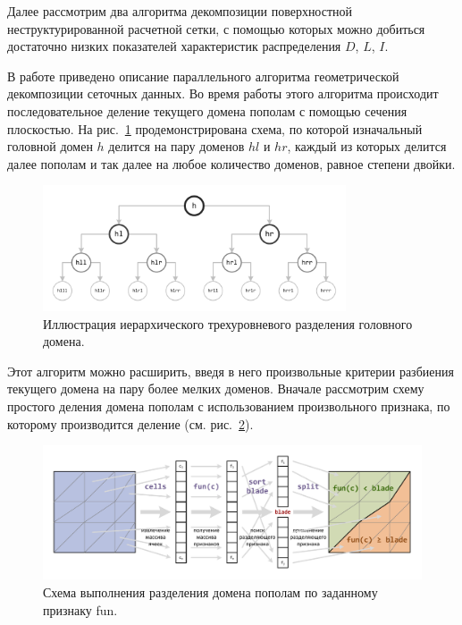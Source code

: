 Далее рассмотрим два алгоритма декомпозиции поверхностной неструктурированной расчетной сетки, с помощью которых можно добиться достаточно низких показателей характеристик распределения $D$, $L$, $I$.


В работе \cite{Golovchenko2020Decomp} приведено описание параллельного алгоритма геометрической декомпозиции сеточных данных.
Во время работы этого алгоритма происходит последовательное деление текущего домена пополам с помощью сечения плоскостью.
На рис.~\ref{fig:text_2_decompsurf_hierarchical} продемонстрирована схема, по которой изначальный головной домен $h$ делится на пару доменов $hl$ и $hr$, каждый из которых делится далее пополам и так далее на любое количество доменов, равное степени двойки.

\begin{figure}[ht]
\centering
\includegraphics[width=0.8\textwidth]{fig/par_hierarchical.pdf}
\singlespacing
{}\caption{Иллюстрация иерархического трехуровневого разделения головного домена.}
\label{fig:text_2_decompsurf_hierarchical}
\end{figure}

Этот алгоритм можно расширить, введя в него произвольные критерии разбиения текущего домена на пару более мелких доменов.
Вначале рассмотрим схему простого деления домена пополам с использованием произвольного признака, по которому производится деление (см. рис.~\ref{fig:text_2_decompsurf_split}).

\begin{figure}[ht]
\centering
\includegraphics[width=1.0\textwidth]{fig/par_split.pdf}
\singlespacing
{}\caption{Схема выполнения разделения домена пополам по заданному признаку fun.}
\label{fig:text_2_decompsurf_split}
\end{figure}

